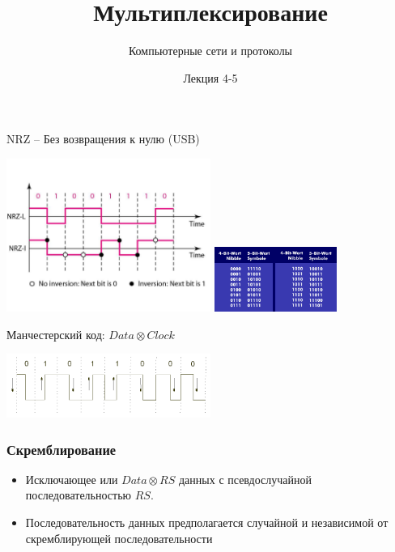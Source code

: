 \documentclass[utf8]{beamer}
\title{Мультиплексирование}
\author {Компьютерные сети и протоколы}
\date{Лекция 4-5}
\begin{document}
\begin{frame}
\titlepage
\end{frame}
\begin{frame}
\begin{block}{NRZ -- Без возвращения к нулю (USB)}
\begin{center}
\includegraphics[width=0.5\textwidth]{pic/NRZ.png}
\includegraphics[width=0.3\textwidth]{pic/4b-5b.png}
\end{center}
\end{block}
\begin{block}{Манчестерский код: $Data \otimes Clock$}
\begin{center}
\includegraphics[width=0.5\textwidth]{pic/manchester-code.png}
\end{center}
\end{block}

\end{frame}
\begin{frame}
\frametitle{Скремблирование}
\begin{itemize}
 \item Исключающее или $Data\otimes RS$ данных с псевдослучайной последовательностью $RS$.
 \item Последовательность данных предполагается случайной и независимой от скремблирующей последовательности
\end{itemize}

\end{frame}
\end{document}
